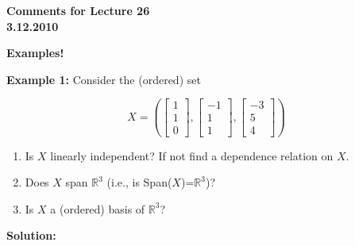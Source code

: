 \documentclass[12pt]{article}
\begin{document}
\begin{center}
{\large \bf Comments for Lecture 26}\\
\bf{3.12.2010}
\end{center}


\begin{center}{\LARGE \bf Examples!}\end{center}


{\bf Example 1:}  Consider the (ordered) set 

\[X = \left( \left[ \begin{array}{r} 1 \\ 1  \\ 0  \end{array} \right], \left[ \begin{array}{r} -1 \\  1 \\ 1  \end{array} \right], \left[ \begin{array}{r}-3 \\ 5  \\ 4  \end{array} \right] \right) \]

\begin{enumerate}
\item Is $X$ linearly independent?  If not find a dependence relation on $X$.
\item Does $X$ span $\mathbb{R}^3$ (i.e., is Span($X$)=$\mathbb{R}^3$)?
\item Is $X$ a (ordered) basis of $\mathbb{R}^3$?
\end{enumerate}

{\bf Solution:}
\end{document}
